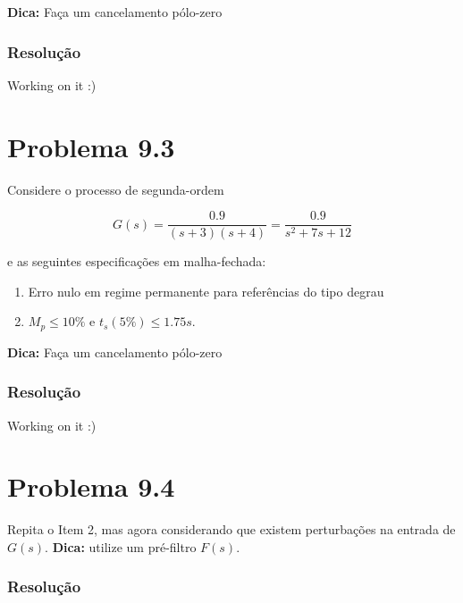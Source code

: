 \documentclass[
]{book}
\providecommand{\tightlist}{%
  \setlength{\itemsep}{0pt}\setlength{\parskip}{0pt}}
\theoremstyle{definition}
\theoremstyle{definition}
\theoremstyle{definition}
\theoremstyle{remark}
\begin{document}
\textbf{Dica:} Faça um cancelamento pólo-zero

\hypertarget{resoluuxe7uxe3o-29}{%
\subsubsection*{Resolução}\label{resoluuxe7uxe3o-29}}

Working on it :)

\hypertarget{problema-9.3}{%
\section*{Problema 9.3}\label{problema-9.3}}

Considere o processo de segunda-ordem

\[
G(s) = \frac{0.9}{(s+3)(s+4)}=\frac{0.9}{s^2+7s+12}
\]

e as seguintes especificações em malha-fechada:

\begin{enumerate}
\def\labelenumi{\alph{enumi}.}
\tightlist
\item
  Erro nulo em regime permanente para referências do tipo degrau
\item
  \(M_p\leq 10\%\) e \(t_s(5\%)\leq1.75s\).
\end{enumerate}

\textbf{Dica:} Faça um cancelamento pólo-zero

\hypertarget{resoluuxe7uxe3o-30}{%
\subsubsection*{Resolução}\label{resoluuxe7uxe3o-30}}

Working on it :)

\hypertarget{problema-9.4}{%
\section*{Problema 9.4}\label{problema-9.4}}

Repita o Item 2, mas agora considerando que existem perturbações na entrada de \(G(s)\). \textbf{Dica:} utilize um pré-filtro \(F(s)\).

\hypertarget{resoluuxe7uxe3o-31}{%
\subsubsection*{Resolução}\label{resoluuxe7uxe3o-31}}
\end{document}
